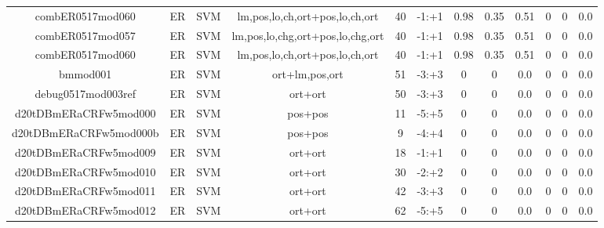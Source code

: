 \documentclass[a4paper]{article}
\begin{document}
\begin{landscape}
\begin{center}
\begin{tabular}{ |c|c|c|c|c|c|c|c|c|c|c|c|}
 
 	
 	\small{ combER0517mod060 } & ER & SVM & lm,pos,lo,ch,ort+pos,lo,ch,ort  &  40 &  -1:+1  &  0.98 & 0.35 & 0.51  &  0 & 0 & 0.0 \\
 	

 
 	
 	\small{ combER0517mod057 } & ER & SVM & lm,pos,lo,chg,ort+pos,lo,chg,ort  &  40 &  -1:+1  &  0.98 & 0.35 & 0.51  &  0 & 0 & 0.0 \\
 	

 
 	
 	\small{ combER0517mod060 } & ER & SVM & lm,pos,lo,ch,ort+pos,lo,ch,ort  &  40 &  -1:+1  &  0.98 & 0.35 & 0.51  &  0 & 0 & 0.0 \\
 	

 
 	
 	\small{ bmmod001 } & ER & SVM & ort+lm,pos,ort  &  51 &  -3:+3  &  0 & 0 & 0.0  &  0 & 0 & 0.0 \\
 	

 
 	
 	\small{ debug0517mod003ref } & ER & SVM & ort+ort  &  50 &  -3:+3  &  0 & 0 & 0.0  &  0 & 0 & 0.0 \\
 	

 
 	
 	\small{ d20tDBmERaCRFw5mod000 } & ER & SVM & pos+pos  &  11 &  -5:+5  &  0 & 0 & 0.0  &  0 & 0 & 0.0 \\
 	

 
 	
 	\small{ d20tDBmERaCRFw5mod000b } & ER & SVM & pos+pos  &  9 &  -4:+4  &  0 & 0 & 0.0  &  0 & 0 & 0.0 \\
 	

 
 	
 	\small{ d20tDBmERaCRFw5mod009 } & ER & SVM & ort+ort  &  18 &  -1:+1  &  0 & 0 & 0.0  &  0 & 0 & 0.0 \\
 	

 
 	
 	\small{ d20tDBmERaCRFw5mod010 } & ER & SVM & ort+ort  &  30 &  -2:+2  &  0 & 0 & 0.0  &  0 & 0 & 0.0 \\
 	

 
 	
 	\small{ d20tDBmERaCRFw5mod011 } & ER & SVM & ort+ort  &  42 &  -3:+3  &  0 & 0 & 0.0  &  0 & 0 & 0.0 \\
 	

 
 	
 	\small{ d20tDBmERaCRFw5mod012 } & ER & SVM & ort+ort  &  62 &  -5:+5  &  0 & 0 & 0.0  &  0 & 0 & 0.0 \\
 	

\end{tabular}
\end{center}
\end{landscape}
\end{document}

